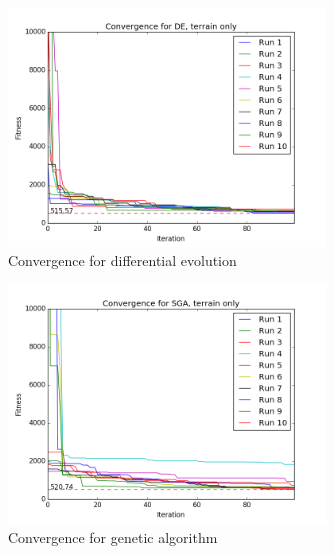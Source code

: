 \documentclass{tamuccthesis}
\begin{document}
\begin{figure}
    \captionsetup{justification=centering}
    \centering
        \includegraphics[width=0.75\textwidth]{conv_DE_a.png}
    \caption[]{{\small Convergence for differential evolution}}   
    \label{fig:convergence_a_DE}
\end{figure}

\begin{figure}
    \captionsetup{justification=centering}
    \centering
        \includegraphics[width=0.75\textwidth]{conv_SGA_a.png}
    \caption[]{{\small Convergence for genetic algorithm}}   
    \label{fig:convergence_a_SGA}
\end{figure}
\end{document}

